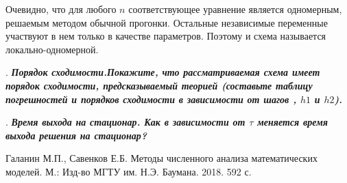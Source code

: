 \documentclass[12pt, a4paper]{article}
\newcounter{mycounter}
\newcommand{\quastion}[1]{%
	\stepcounter{mycounter}%
	\textbf{\themycounter}.  %
	\textbf{\textit{#1}}
	
}
\begin{document}
	Очевидно, что для любого $n$ соответствующее уравнение является одномерным, решаемым методом обычной прогонки. Остальные независимые переменные участвуют в нем только в качестве параметров. Поэтому и схема называется локально-одномерной.
	\bigskip
	
	
	
	\quastion{Порядок сходимости.Покажите, что рассматриваемая схема имеет порядок сходимости, предсказываемый теорией (составьте таблицу погрешностей и порядков сходимости в зависимости от шагов , $h1$ и $h2$).}
	\bigskip
	
	
	\begin{table}[h!]
		\centering
		\caption{Порядок метода}
		\label{tab:my_label}
	\end{table}
	
	
	\quastion{ Время выхода на стационар. Как в зависимости от $\tau$ меняется время выхода решения на стационар?}
	\bigskip
	
	
	
	
	
	\clearpage
	\begin{thebibliography}{1}
		 Галанин М.П., Савенков Е.Б. Методы численного анализа математических моделей. М.: Изд-во МГТУ им. Н.Э. Баумана. 2018. 592 с.
		
	\end{thebibliography}
	
\end{document}
